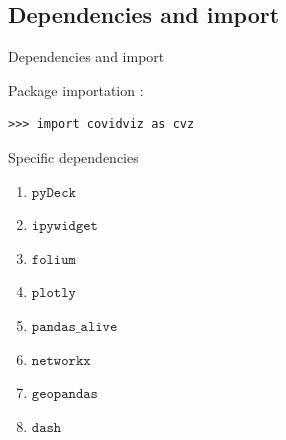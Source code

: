\documentclass[11pt, compress, tikz, xcolor=table]{beamer}
\theoremstyle{definition}
\begin{document}
\subsection{Dependencies and import}
\begin{frame}[fragile]{Dependencies and import}

Package importation :
\begin{verbatim}
>>> import covidviz as cvz
\end{verbatim}

\begin{block}{Specific dependencies}
\begin{enumerate}
\item $\texttt{pyDeck}$
\item $\texttt{ipywidget}$
\item $\texttt{folium}$
\item $\texttt{plotly}$
\item $\texttt{pandas\_alive}$
\item $\texttt{networkx}$
\item $\texttt{geopandas}$
\item $\texttt{dash}$

\end{enumerate}
\end{block}
\end{frame}
\end{document}

